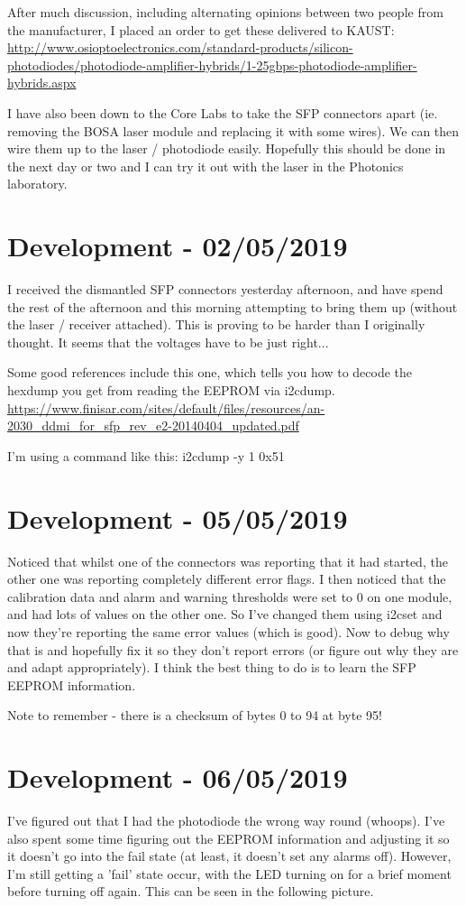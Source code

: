 After much discussion, including alternating opinions between two
people from the manufacturer, I placed an order to get these delivered
to KAUST:
\url{http://www.osioptoelectronics.com/standard-products/silicon-photodiodes/photodiode-amplifier-hybrids/1-25gbps-photodiode-amplifier-hybrids.aspx}

I have also been down to the Core Labs to take the SFP
connectors apart (ie. removing the \ac{BOSA} laser module
and replacing it with some wires). We can then wire them
up to the laser / photodiode easily. Hopefully this should
be done in the next day or two and I can try it out with
the laser in the Photonics laboratory.

\section{Development - 02/05/2019}
I received the dismantled SFP connectors yesterday afternoon, and
have spend the rest of the afternoon and this morning attempting
to bring them up (without the laser / receiver attached). This
is proving to be harder than I originally thought. It seems
that the voltages have to be just right...

Some good references include this one, which tells you how to decode
the hexdump you get from reading the EEPROM via i2cdump.
\url{https://www.finisar.com/sites/default/files/resources/an-2030_ddmi_for_sfp_rev_e2-20140404_updated.pdf}

I'm using a command like this: i2cdump -y 1 0x51

\section{Development - 05/05/2019}
Noticed that whilst one of the connectors was reporting that it had started,
the other one was reporting completely different error flags. I then noticed
that the calibration data and alarm and warning thresholds were set to 0 on
one module, and had lots of values on the other one. So I've changed them
using i2cset and now they're reporting the same error values (which is good).
Now to debug why that is and hopefully fix it so they don't report errors (or
figure out why they are and adapt appropriately). I think the best thing to do
is to learn the \ac{SFP} EEPROM information.

Note to remember - there is a checksum of bytes 0 to 94 at byte 95!

\section{Development - 06/05/2019}
I've figured out that I had the photodiode the wrong way round (whoops). I've
also spent some time figuring out the EEPROM information and adjusting it so it
doesn't go into the fail state (at least, it doesn't set any alarms off).
However, I'm still getting a 'fail' state occur, with the LED turning on for
a brief moment before turning off again. This can be seen in the following
picture.

